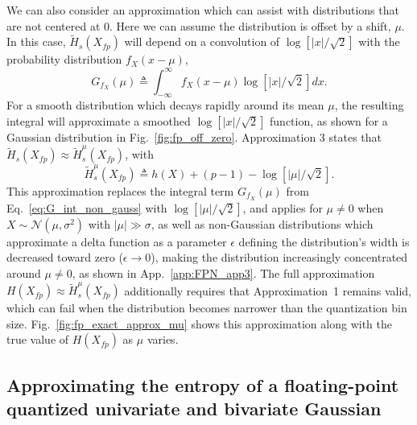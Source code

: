 \documentclass[12pt,onecolumn, margin=1in]{IEEEtran}
\newcommand{\bracket}[1]{\left[ #1 \right]}
\newcommand{\Ht}{\tilde{H}}
\newcommand{\Xfp}{X_{fp}}
\begin{document}
We can also consider an approximation which can assist with distributions that are not centered at 0. Here we can assume the distribution is offset by a shift, $\mu$. In this case, $\Ht_s(X_{fp})$ will depend on a convolution of $\log[|x|/\sqrt{2}]$ with the probability distribution $f_X(x - \mu)$, 
\begin{equation}
    \label{eq:G_int_non_gauss}
    G_{f_X}(\mu) \triangleq \int^{\infty}_{-\infty} f_X(x-\mu) \log[|x|/\sqrt{2}] dx.
\end{equation}
For a smooth distribution which decays rapidly around its mean $\mu$, the resulting integral will approximate a smoothed $\log\bracket{|x|/\sqrt{2}}$ function, as shown for a Gaussian distribution in Fig.~\ref{fig:fp_off_zero}. Approximation 3 states that $\tilde H_s(X_{fp}) \approx \tilde H_s^\mu(X_{fp})$, with
\begin{equation}
    \label{eq:three_approxes}
    \Ht^\mu_s(\Xfp) \triangleq h(X) + (p-1) - \log\bracket{|\mu| / \sqrt{2}}.
\end{equation}
This approximation replaces the integral term $G_{f_X}(\mu)$ from Eq.~\eqref{eq:G_int_non_gauss} with $\log[|\mu|/\sqrt{2}]$, and applies for $\mu \neq 0$ when $X \sim \mathcal{N}(\mu, \sigma^2)$ with $|\mu| \gg \sigma$, as well as non-Gaussian distributions which approximate a delta function as a parameter $\epsilon$ defining the distribution's width is decreased toward zero ($\epsilon \to 0$), making the distribution increasingly concentrated around $\mu \neq 0$, as shown in App.~\ref{app:FPN_app3}. The full approximation $H(X_{fp}) \approx \Ht^\mu_s(X_{fp})$ additionally requires that Approximation~1 remains valid, which can fail when the distribution becomes narrower than the quantization bin size. 
Fig.~\ref{fig:fp_exact_approx_mu} shows this approximation along with the true value of $H(\Xfp)$ as $\mu$ varies.


















\subsection{Approximating the entropy of a floating-point quantized univariate and bivariate Gaussian}

\label{sec:gaussians}
\end{document}
